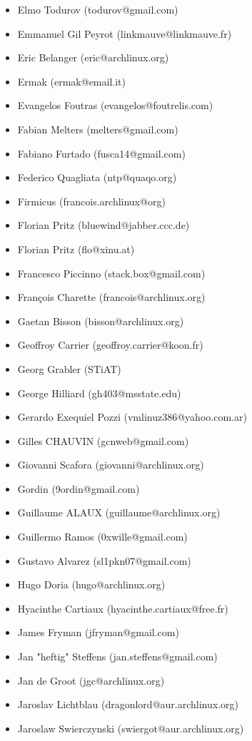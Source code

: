 \begin{latin}
\begin{itemize}
\item  Elmo Todurov (todurov@gmail.com)
\item  Emmanuel Gil Peyrot (linkmauve@linkmauve.fr)
\item  Eric Belanger (eric@archlinux.org)
\item  Ermak (ermak@email.it)
\item  Evangelos Foutras (evangelos@foutrelis.com)
\item  Fabian Melters (melters@gmail.com)
\item  Fabiano Furtado (fusca14@gmail.com)
\item  Federico Quagliata (ntp@quaqo.org)
\item  Firmicus (francois.archlinux@org)
\item  Florian Pritz (bluewind@jabber.ccc.de)
\item  Florian Pritz (flo@xinu.at)
\item  Francesco Piccinno (stack.box@gmail.com)
\item  François Charette (francois@archlinux.org)
\item  Gaetan Bisson (bisson@archlinux.org)
\item  Geoffroy Carrier (geoffroy.carrier@koon.fr)
\item  Georg Grabler (STiAT)
\item  George Hilliard (gh403@msstate.edu)
\item  Gerardo Exequiel Pozzi (vmlinuz386@yahoo.com.ar)
\item  Gilles CHAUVIN (gcnweb@gmail.com)
\item  Giovanni Scafora (giovanni@archlinux.org)
\item  Gordin (9ordin@gmail.com)
\item  Guillaume ALAUX (guillaume@archlinux.org)
\item  Guillermo Ramos (0xwille@gmail.com)
\item  Gustavo Alvarez (sl1pkn07@gmail.com)
\item  Hugo Doria (hugo@archlinux.org)
\item  Hyacinthe Cartiaux (hyacinthe.cartiaux@free.fr)
\item  James Fryman (jfryman@gmail.com)
\item  Jan "heftig" Steffens (jan.steffens@gmail.com)
\item  Jan de Groot (jgc@archlinux.org)
\item  Jaroslav Lichtblau (dragonlord@aur.archlinux.org)
\item  Jaroslaw Swierczynski (swiergot@aur.archlinux.org)

\end{itemize}
\end{latin}
